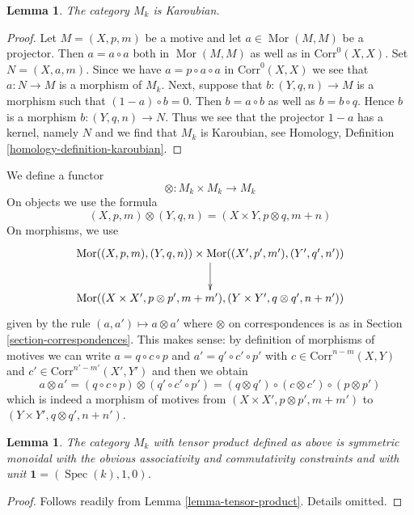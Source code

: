 \documentclass{stacks-project}
\theoremstyle{plain}
\newtheorem{lemma}[subsection]{Lemma}
\theoremstyle{definition}
\theoremstyle{remark}
\numberwithin{equation}{subsection}
\def\Spec{\mathop{\mathrm{Spec}}}
\def\Mor{\mathop{\mathrm{Mor}}\nolimits}
\begin{document}
\begin{lemma}
\label{lemma-Karoubian}
The category $M_k$ is Karoubian.
\end{lemma}

\begin{proof}
Let $M = (X, p, m)$ be a motive and let $a \in \Mor(M, M)$
be a projector. Then $a = a \circ a$ both in $\Mor(M, M)$
as well as in $\text{Corr}^0(X, X)$. Set $N = (X, a, m)$.
Since we have $a = p \circ a \circ a$ in $\text{Corr}^0(X, X)$
we see that $a : N \to M$ is a morphism of $M_k$.
Next, suppose that $b : (Y, q, n) \to M$ is a morphism
such that $(1 - a) \circ b = 0$. Then $b = a \circ b$ as well as
$b = b \circ q$. Hence $b$ is a morphism $b : (Y, q, n) \to N$.
Thus we see that the projector $1 - a$ has a kernel, namely $N$
and we find that $M_k$ is Karoubian, see
Homology, Definition \ref{homology-definition-karoubian}.
\end{proof}

\noindent
We define a functor
$$
\otimes : M_k \times M_k \longrightarrow M_k
$$
On objects we use the formula
$$
(X, p, m) \otimes (Y, q, n) = (X \times Y, p \otimes q, m + n)
$$
On morphisms, we use
$$
\xymatrix{
\Mor((X, p, m), (Y, q, n)) \times
\Mor((X', p', m'), (Y', q', n')) \ar[d] \\
\Mor(
(X \times X', p \otimes p', m + m'),
(Y \times Y', q \otimes q', n + n'))
}
$$
given by the rule $(a, a') \longmapsto a \otimes a'$ where
$\otimes$ on correspondences is as in Section \ref{section-correspondences}.
This makes sense: by definition of morphisms of motives
we can write $a = q \circ c \circ p$ and $a' = q' \circ c' \circ p'$
with $c \in \text{Corr}^{n - m}(X, Y)$ and
$c' \in \text{Corr}^{n' - m'}(X', Y')$
and then we obtain
$$
a \otimes a' =
(q \circ c \circ p) \otimes (q' \circ c' \circ p') =
(q \otimes q') \circ (c \otimes c') \circ (p \otimes p')
$$
which is indeed a morphism of motives from
$(X \times X', p \otimes p', m + m')$ to
$(Y \times Y', q \otimes q', n + n')$.

\begin{lemma}
\label{lemma-motives-monoidal}
The category $M_k$ with tensor product defined as above
is symmetric monoidal with the obvious associativity and commutativity
constraints and with unit $\mathbf{1} = (\Spec(k), 1, 0)$.
\end{lemma}

\begin{proof}
Follows readily from Lemma \ref{lemma-tensor-product}. Details omitted.
\end{proof}
\end{document}

